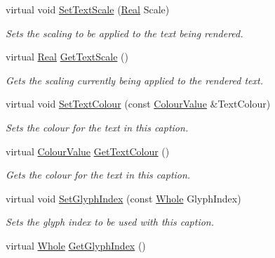 \begin{DoxyCompactItemize}
virtual void \hyperlink{classphys_1_1UI_1_1Caption_a3dad9c0c70e461734166937f6961a459}{SetTextScale} (\hyperlink{namespacephys_af7eb897198d265b8e868f45240230d5f}{Real} Scale)
\begin{DoxyCompactList}\small\item\em Sets the scaling to be applied to the text being rendered. \item\end{DoxyCompactList}\item 
virtual \hyperlink{namespacephys_af7eb897198d265b8e868f45240230d5f}{Real} \hyperlink{classphys_1_1UI_1_1Caption_a6c916aef18864826feca84a6b8ddf619}{GetTextScale} ()
\begin{DoxyCompactList}\small\item\em Gets the scaling currently being applied to the rendered text. \item\end{DoxyCompactList}\item 
virtual void \hyperlink{classphys_1_1UI_1_1Caption_a48e02a811a03a7542ee9bdcc4303a264}{SetTextColour} (const \hyperlink{classphys_1_1ColourValue}{ColourValue} \&TextColour)
\begin{DoxyCompactList}\small\item\em Sets the colour for the text in this caption. \item\end{DoxyCompactList}\item 
virtual \hyperlink{classphys_1_1ColourValue}{ColourValue} \hyperlink{classphys_1_1UI_1_1Caption_a32bb578e6e92986839e1cd49edfe9422}{GetTextColour} ()
\begin{DoxyCompactList}\small\item\em Gets the colour for the text in this caption. \item\end{DoxyCompactList}\item 
virtual void \hyperlink{classphys_1_1UI_1_1Caption_a854b4f5d5a18c4e5f0cebeb17cf2ece4}{SetGlyphIndex} (const \hyperlink{namespacephys_a460f6bc24c8dd347b05e0366ae34f34a}{Whole} GlyphIndex)
\begin{DoxyCompactList}\small\item\em Sets the glyph index to be used with this caption. \item\end{DoxyCompactList}\item 
virtual \hyperlink{namespacephys_a460f6bc24c8dd347b05e0366ae34f34a}{Whole} \hyperlink{classphys_1_1UI_1_1Caption_a4181591a3186ec4d1f87946891a0ef26}{GetGlyphIndex} ()

\end{DoxyCompactItemize}
